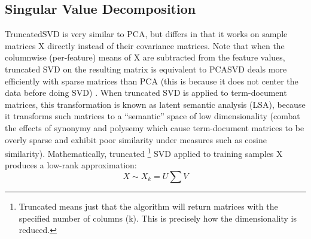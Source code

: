 \documentclass[12pt]{report}
\begin{document}
\subsection{Singular Value Decomposition}
TruncatedSVD is very similar to PCA, but differs in that it works on sample matrices X directly instead of their covariance matrices. Note that when the columnwise (per-feature) means of X are subtracted from the feature values, truncated SVD on the resulting matrix is equivalent to PCASVD deals more efficiently with sparse matrices than PCA (this is because it does not center the data before doing SVD) \cite{halko2009finding}. When truncated SVD is applied to term-document matrices, this transformation is known as latent semantic analysis (LSA), because it transforms such matrices to a “semantic” space of low dimensionality (combat the effects of synonymy and polysemy which cause term-document matrices to be overly sparse and exhibit poor similarity under measures such as cosine similarity).
Mathematically, truncated \footnote{Truncated means just that the algorithm will return matrices with the specified number of columns (k). This is precisely how the dimensionality is reduced.} SVD applied to training samples X produces a low-rank approximation:
\begin{equation}
X \sim X_k = U \sum V
\end{equation}
\end{document}

